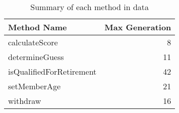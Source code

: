 \begin{table}[ht]
\centering
\begin{tabular}{lr}
  \hline
Method Name & Max Generation \\ 
  \hline
calculateScore &   8 \\ 
  determineGuess &  11 \\ 
  isQualifiedForRetirement &  42 \\ 
  setMemberAge &  21 \\ 
  withdraw &  16 \\ 
   \hline
\end{tabular}
\caption{Summary of each method in data} 
\label{table:each_method_summary 9}
\end{table}
